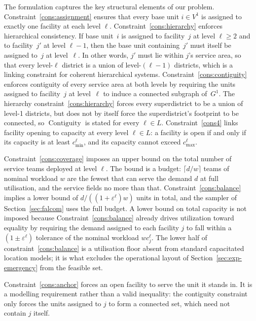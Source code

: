 \documentclass[11pt]{article}
\theoremstyle{definition}
\DeclareMathOperator{\Contiguity}{Contiguity}  %
\begin{document}
The formulation captures the key structural elements of our problem.
Constraint~\eqref{cons:assignment} ensures that every base unit $i \in V^1$ is
assigned to exactly one facility at each level $\ell$. Constraint~\eqref{cons:hierarchy} 
enforces hierarchical consistency. If base unit~$i$ is assigned to facility~$j$ 
at level $\ell \geq 2$ and to facility~$j'$ at level $\ell - 1$, then the base unit 
containing~$j'$ must itself be assigned to~$j$ at level~$\ell$. In other words, 
$j'$ must lie within $j$'s service area, so that every level-$\ell$ district is 
a union of level-$(\ell{-}1)$ districts, which is a linking constraint for 
coherent hierarchical systems. Constraint~\eqref{cons:contiguity} enforces 
contiguity of every service area at both levels by requiring the units assigned 
to facility~$j$ at level~$\ell$ to induce a connected subgraph of~$G^1$. 
The hierarchy constraint~\eqref{cons:hierarchy} forces every
superdistrict to be a union of level-1 districts, but does not by
itself force the superdistrict's footprint to be connected, so
$\Contiguity$ is stated for every $\ell \in L$.
Constraint~\eqref{cons4} links facility opening to capacity at 
every level $\ell \in L$: a facility is open if and only if its 
capacity is at least $c^\ell_{\min}$, and its capacity cannot exceed 
$c^\ell_{\max}$.

Constraint~\eqref{cons:coverage} imposes an upper bound on the total number of service teams deployed at level $\ell$. The bound is a budget: $\lceil d/w \rceil$ teams of nominal workload $w$ are the fewest that can serve the demand $d$ at full utilisation, and the service fields no more than that. Constraint~\eqref{cons:balance} implies a lower bound of $d/((1+\varepsilon^\ell)w)$ units in total, and the sampler of Section~\ref{sec:falcom} uses the full budget. A lower bound on total capacity is not imposed because Constraint~\eqref{cons:balance} already drives utilization
toward equality by requiring the demand assigned to each facility $j$ to fall within a $(1 \pm \varepsilon^{\ell})$ tolerance of the nominal workload $w c^\ell_j$. The lower half of constraint~\eqref{cons:balance} is a utilisation floor absent from standard capacitated location models; it is what excludes the operational layout of Section~\ref{sec:exp-emergency} from the feasible set.  

Constraint~\eqref{cons:anchor} forces an open facility to serve the unit it stands in. It is a modelling requirement rather than a valid inequality: the contiguity constraint only forces the units assigned to $j$ to form a connected set, which need not contain $j$ itself.
\end{document}
